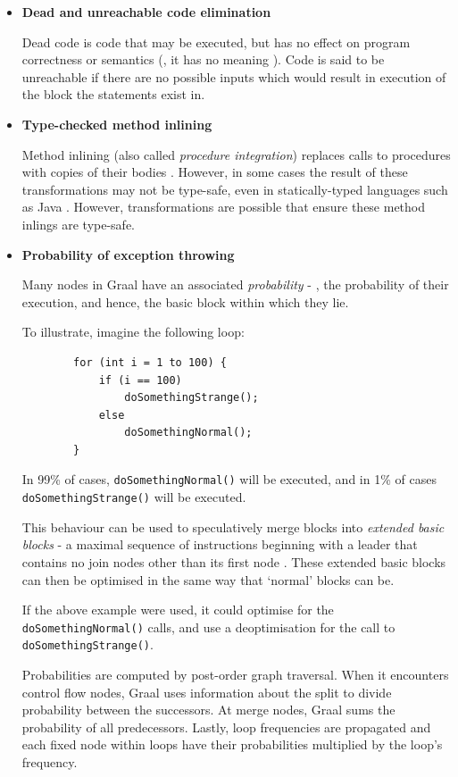\begin{itemize}
	\item \textbf{Dead and unreachable code elimination}
		
		Dead code is code that may be executed, but has no effect on program correctness or semantics (\ie, it has no meaning \citep[p.~533]{DragonBook}). Code is said to be unreachable if there are no possible inputs which would result in execution of the block the statements exist in.
	
	\item \textbf{Type-checked method inlining}
	
		Method inlining (also called \textit{procedure integration}) replaces calls to procedures with copies of their bodies \citep[p.~465]{ACDI}. However, in some cases the result of these transformations may not be type-safe, even in statically-typed languages such as Java \citep{Magnusson2002}. However, transformations are possible that ensure these method inlings are type-safe.
	
	\item \textbf{Probability of exception throwing}
		
		Many nodes in Graal have an associated \emph{probability} - \ie, the probability of their execution, and hence, the basic block within which they lie.
		
		To illustrate, imagine the following loop:
		
		\begin{verbatim}
		for (int i = 1 to 100) {
		    if (i == 100)
		        doSomethingStrange();
		    else
		        doSomethingNormal();
		}\end{verbatim}
		
		In 99\% of cases, \texttt{doSomethingNormal()} will be executed, and in 1\% of cases \texttt{doSomethingStrange()} will be executed.
		
		This behaviour can be used to speculatively merge blocks into \textit{extended basic blocks} - a maximal sequence of instructions beginning with a leader that contains no join nodes other than its first node \citep[p.~175]{ACDI}. These extended basic blocks can then be optimised in the same way that `normal' blocks can be.
		
		If the above example were used, it could optimise for the \texttt{doSomethingNormal()} calls, and use a deoptimisation for the call to \texttt{doSomethingStrange()}.
		
		Probabilities are computed by post-order graph traversal. When it encounters control flow nodes, Graal uses information about the split to divide probability between the successors. At merge nodes, Graal sums the probability of all predecessors. Lastly, loop frequencies are propagated and each fixed node within loops have their probabilities multiplied by the loop's frequency.
		

\end{itemize}
